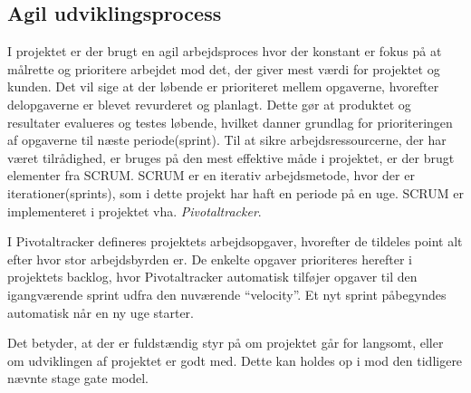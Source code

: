 



\subsection{Agil udviklingsprocess}
\label{subsec:agil}
I projektet er der brugt en agil arbejdsproces hvor der konstant er fokus på at målrette og prioritere arbejdet mod det, der giver mest værdi for projektet og kunden. Det vil sige at der løbende er prioriteret mellem opgaverne, hvorefter delopgaverne er blevet revurderet og planlagt. Dette gør at produktet og resultater evalueres og testes løbende, hvilket danner grundlag for prioriteringen af opgaverne til næste periode(sprint). Til at sikre arbejdsressourcerne, der har været tilrådighed, er bruges på den mest effektive måde i projektet, er der brugt elementer fra SCRUM. SCRUM er en iterativ arbejdsmetode, hvor  der er iterationer(sprints), som i dette projekt har haft en periode på en uge. SCRUM er implementeret i projektet vha. \textit{Pivotaltracker}. 

I Pivotaltracker defineres projektets arbejdsopgaver, hvorefter de tildeles point alt efter hvor stor arbejdsbyrden er. De enkelte opgaver prioriteres herefter i projektets backlog, hvor Pivotaltracker automatisk tilføjer opgaver til den igangværende sprint udfra den nuværende “velocity”. Et nyt sprint påbegyndes automatisk når en ny uge starter.

Det betyder, at der er fuldstændig styr på om projektet går for langsomt, eller om udviklingen af projektet er godt med. Dette kan holdes op i mod den tidligere nævnte stage gate model.

